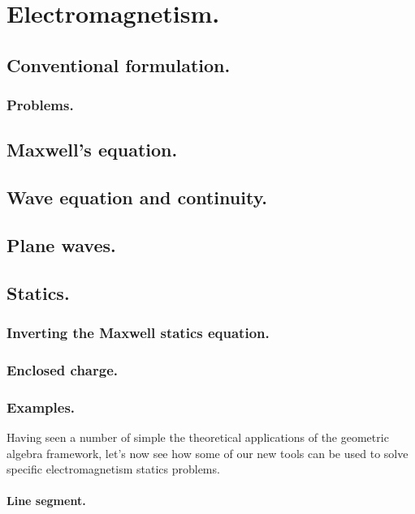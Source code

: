 %
%
   \chapter{Electromagnetism.}
      \section{Conventional formulation.}
         
         \subsection{Problems.}
            
      \section{Maxwell's equation.}
         
      \section{Wave equation and continuity.}
         
      \section{Plane waves.}
         
      \section{Statics.}
         \subsection{Inverting the Maxwell statics equation.}
            
         \subsection{Enclosed charge.}
            
         \subsection{Examples.}
            Having seen a number of simple the theoretical applications of the geometric algebra framework, let's now see how some of our new tools can be used to solve specific electromagnetism statics problems.
         \subsubsection{Line segment.}
            

